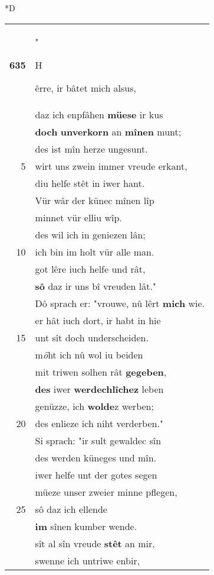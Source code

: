 \documentclass[8pt,a4paper,notitlepage]{article}
\begin{document}
\begin{table}[ht]
\begin{minipage}[t]{0.5\linewidth}
\small
\begin{center}*D
\end{center}
\begin{tabular}{rl}
\textbf{635} & "\begin{large}H\end{large}êrre, ir bâtet mich alsus,\\ 
 & daz ich enpfâhen \textbf{müese} ir kus\\ 
 & \textbf{doch} \textbf{unverkorn} an \textbf{mînen} munt;\\ 
 & des ist mîn herze ungesunt.\\ 
5 & wirt uns zwein immer vreude erkant,\\ 
 & diu helfe stêt in iwer hant.\\ 
 & Vür wâr der künec mînen lîp\\ 
 & minnet vür elliu wîp.\\ 
 & des wil ich in geniezen lân;\\ 
10 & ich bin im holt vür alle man.\\ 
 & got lêre iuch helfe und rât,\\ 
 & \textbf{sô} daz ir uns bî vreuden lât."\\ 
 & Dô sprach er: "vrouwe, nû lêrt \textbf{mich} wie.\\ 
 & er hât iuch dort, ir habt in hie\\ 
15 & unt sît doch underscheiden.\\ 
 & m\textit{ö}ht ich nû wol iu beiden\\ 
 & mit triwen solhen rât \textbf{gegeben},\\ 
 & \textbf{des} iwer \textbf{werdechlîchez} leben\\ 
 & genüzze, ich \textbf{wolde}z werben;\\ 
20 & des enlieze ich niht verderben."\\ 
 & Si sprach: "ir sult gewaldec sîn\\ 
 & des werden küneges und mîn.\\ 
 & iwer helfe unt der gotes segen\\ 
 & müeze unser zweier minne pflegen,\\ 
25 & sô daz ich ellende\\ 
 & \textbf{im} sînen kumber wende.\\ 
 & sît al sîn vreude \textbf{stêt} an mir,\\ 
 & swenne ich untriwe enbir,\\ 

\end{tabular}
\end{minipage}
\end{table}
\end{document}
